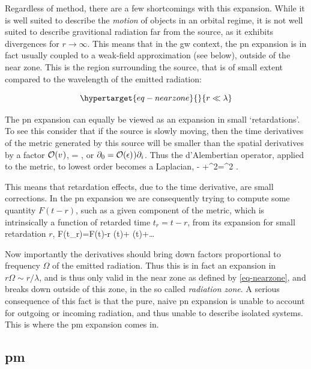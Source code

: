 \documentclass[
  10pt,
  a4paper,
  DIV=11,
  numbers=noendperiod,
  twoside]{scrreprt}
\let\[\relax \let\]\relax %
\DeclareRobustCommand{\[}{\begin{equation}}
\DeclareRobustCommand{\]}{\end{equation}}
\begin{document}
Regardless of method, there are a few shortcomings with this expansion.
While it is well suited to describe the \emph{motion} of objects in an
orbital regime, it is not well suited to describe gravitional radiation
far from the source, as it exhibits divergences for
\(r\to\infty\).
This means that in the \gls{gw} context, the \gls{pn} expansion is in
fact usually coupled to a weak-field approximation (see below), outside
of the near zone. This is the region surrounding the source, that is of
small extent compared to the wavelength of the emitted radiation:

\begin{equation}\protect\hypertarget{eq-nearzone}{}{
r \ll \lambda
}\label{eq-nearzone}\end{equation}

The \gls{pn} expansion can equally be viewed as an expansion in small
`retardations'. To see this consider that if the source is slowly
moving, then the time derivatives of the metric generated by this source
will be smaller than the spatial derivatives by a factor \(\mathcal{O}(v^{})\),
\[
= ,
\] or \(\partial_0=\mathcal{O}(\epsilon)^{}) \partial_i\). Thus the
d'Alembertian operator, applied to the metric, to lowest order becomes a
Laplacian, \[
- +\nabla^2= \nabla^2 .
\]

This means that retardation effects, due to the time derivative, are
small corrections. In the \gls{pn} expansion we are consequently trying
to compute some quantity \(F(t-r)\), such as a given component of the
metric, which is intrinsically a function of retarded time \(t_r=t-r\),
from its expansion for small retardation \(r\), \[
F(t_r)=F(t)-{r} (t)+ (t)+\ldots
\]

Now importantly the derivatives should bring down factors proportional
to frequency \(\Omega\) of the emitted radiation. Thus this is in fact
an expansion in \(r \Omega\sim r / \lambda\), and is thus only valid in
the near zone as defined by \ref{eq-nearzone}, and breaks down outside
of this zone, in the so called \emph{radiation zone}. A serious
consequence of this fact is that the pure, naive \gls{pn} expansion is
unable to account for outgoing or incoming radiation, and thus unable to
describe isolated systems. This is where the \gls{pm} expansion comes
in.

\hypertarget{pm}{%
\subsection{\texorpdfstring{\gls{pm}}{}}\label{pm}}
\end{document}
